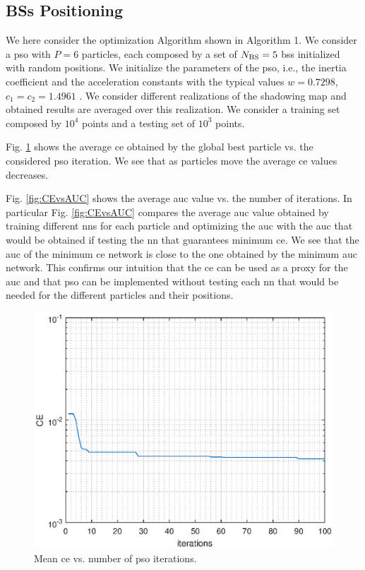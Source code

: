 \documentclass[twocolumns]{IEEEtran}
\begin{document}
\subsection{BSs Positioning}
We here consider the optimization Algorithm shown in Algorithm 1. We consider a \ac{pso} with $P=6$ particles, each composed by a set of $N_{\rm BS}=5$ \acp{bs} initialized with random positions. We initialize the parameters of the \ac{pso}, i.e., the inertia coefficient and the acceleration constants with the typical values $w=0.7298$, $c_1=c_2=1.4961$ \cite{Kennedy-11}. We consider different realizations of the shadowing map and obtained results are averaged over this realization. We consider a training set composed by $10^4$ points and a testing set of $10^3$ points.

Fig. \ref{fig:CE} shows the average \ac{ce} obtained by the global best particle vs. the considered \ac{pso} iteration. We see that as particles move the average \ac{ce} values decreases.

Fig. \ref{fig:CEvsAUC} shows the average \ac{auc} value vs. the number of iterations. In particular Fig. \ref{fig:CEvsAUC} compares the average \ac{auc} value obtained by training different \acp{nn} for each particle and optimizing the \ac{auc} with the \ac{auc} that would be obtained if testing the \ac{nn} that guarantees minimum \ac{ce}. We see that the \ac{auc} of the minimum \ac{ce} network is close to the one obtained by the minimum \ac{auc} network. This confirms our intuition that the \ac{ce} can be used as a proxy for the \ac{auc} and that \ac{pso} can be implemented without testing each \ac{nn} that would be needed for the different particles and their positions.

\begin{figure}[t]
    \centering
    \includegraphics[width=1\columnwidth]{CE_3.eps}
    \caption{Mean \ac{ce} vs. number of \ac{pso} iterations.}
    \label{fig:CE}
\end{figure}
\end{document}
